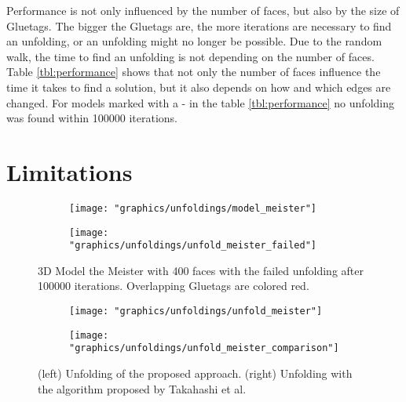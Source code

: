 \documentclass[draft,final]{vutinfth} %
\begin{document}
\label{tbl:performance}
\endgroup

Performance is not only influenced by the number of faces, but also by the size of Gluetags. The bigger the Gluetags are, the more iterations are necessary to find an unfolding, or an unfolding might no longer be possible. Due to the random walk, the time to find an unfolding is not depending on the number of faces. Table \ref{tbl:performance} shows that not only the number of faces influence the time it takes to find a solution, but it also depends on how and which edges are changed. For models marked with a - in the table \ref{tbl:performance} no unfolding was found within 100000 iterations.



\section{Limitations}
\label{sec:limitations}

\begin{figure}
  \begin{subfigure}[b]{0.475\textwidth}
    \texttt{[image: "graphics/unfoldings/model\_meister"]}
  \end{subfigure}
  \begin{subfigure}[b]{0.475\textwidth}
    \texttt{[image: "graphics/unfoldings/unfold\_meister\_failed"]}
  \end{subfigure}
  
  \caption{3D Model the Meister with 400 faces with the failed unfolding after 100000 iterations. Overlapping Gluetags are colored red.}
  \label{fig:meister_failed}
\end{figure}

\begin{figure}
  \begin{subfigure}[b]{0.475\textwidth}
    \texttt{[image: "graphics/unfoldings/unfold\_meister"]}
  \end{subfigure}
  \begin{subfigure}[b]{0.475\textwidth}
    \texttt{[image: "graphics/unfoldings/unfold\_meister\_comparison"]}
  \end{subfigure}
  
  \caption{(left) Unfolding of the proposed approach. (right) Unfolding with the algorithm proposed by Takahashi et al.\cite{takahashi2011optimized}}
  \label{fig:meister_comparison}
\end{figure}
\end{document}
